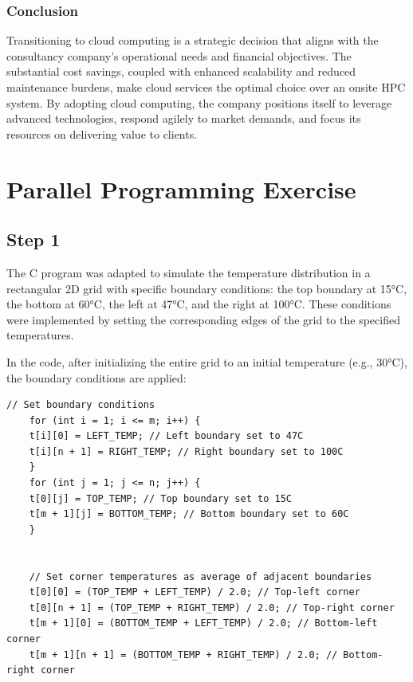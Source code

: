 \documentclass{article}
\begin{document}
\subsubsection{Conclusion}
Transitioning to cloud computing is a strategic decision that aligns with the consultancy company's operational needs and financial objectives. The substantial cost savings, coupled with enhanced scalability and reduced maintenance burdens, make cloud services the optimal choice over an onsite HPC system. By adopting cloud computing, the company positions itself to leverage advanced technologies, respond agilely to market demands, and focus its resources on delivering value to clients.

\newpage

\section{Parallel Programming Exercise}

\subsection{Step 1}

The C program was adapted to simulate the temperature distribution in a rectangular 2D grid with specific boundary conditions: the top boundary at 15°C, the bottom at 60°C, the left at 47°C, and the right at 100°C. These conditions were implemented by setting the corresponding edges of the grid to the specified temperatures.

In the code, after initializing the entire grid to an initial temperature (e.g., 30°C), the boundary conditions are applied:

\begin{lstlisting}[style=CStyle, caption={Setting Boundary Conditions}]
    // Set boundary conditions
    for (int i = 1; i <= m; i++) {
    t[i][0] = LEFT_TEMP; // Left boundary set to 47C
    t[i][n + 1] = RIGHT_TEMP; // Right boundary set to 100C
    }
    for (int j = 1; j <= n; j++) {
    t[0][j] = TOP_TEMP; // Top boundary set to 15C
    t[m + 1][j] = BOTTOM_TEMP; // Bottom boundary set to 60C
    }
    
    
    // Set corner temperatures as average of adjacent boundaries
    t[0][0] = (TOP_TEMP + LEFT_TEMP) / 2.0; // Top-left corner
    t[0][n + 1] = (TOP_TEMP + RIGHT_TEMP) / 2.0; // Top-right corner
    t[m + 1][0] = (BOTTOM_TEMP + LEFT_TEMP) / 2.0; // Bottom-left corner
    t[m + 1][n + 1] = (BOTTOM_TEMP + RIGHT_TEMP) / 2.0; // Bottom-right corner
    \end{lstlisting}
\end{document}

